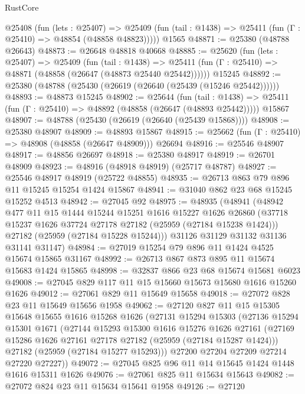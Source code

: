 \begin{lexlean}{RustCore}
\begin{coremodule}
    @25408
      (fun (lets : @25407) =>
      @25409 (fun (tail : @1438) => @25411 (fun (Γ : @25410) => @48854 (@48858 @48823)))))
    @1565
@48871 := @25380 (@48788 @26643)
@48873 := @26648 @48818 @40668
@48885 := @25620
    (fun (lets : @25407) =>
    @25409
      (fun (tail : @1438) =>
      @25411 (fun (Γ : @25410) => @48871 (@48858 (@26647 (@48873 @25440 @25442))))))
    @15245
@48892 := @25380 (@48788 (@25430 (@26619 (@26640 (@25439 (@15246 @25442))))))
@48893 := @48873 @15245
@48902 := @25644
    (fun (tail : @1438) => @25411 (fun (Γ : @25410) => @48892 (@48858 (@26647 (@48893 @25442)))))
    @15867
@48907 := @48788 (@25430 (@26619 (@26640 (@25439 @15868))))
@48908 := @25380 @48907
@48909 := @48893 @15867
@48915 := @25662 (fun (Γ : @25410) => @48908 (@48858 (@26647 @48909))) @26694
@48916 := @25546 @48907
@48917 := @48856 @26697
@48918 := @25380 @48917
@48919 := @26701 @48909
@48923 := @48916 (@48918 @48919) (@25717 @48787)
@48927 := @25546 @48917 @48919 (@25722 @48855)
@48935 := @26713 @863 @79 @896 @11 @15245 @15254 @1424 @15867
@48941 := @31040 @862 @23 @68 @15245 @15252 @4513
@48942 := @27045 @92
@48975 := @48935
    (@48941
      (@48942
        @477
        @11
        @15
        @1444
        @15244
        @15251
        @1616
        @15227
        @1626
        @26860
        (@37718 @15237 @1626 @37724 @27178 @27182 (@25959 (@27184 @15238 @1424)))
        @27182
        (@25959 (@27184 @15228 @15244)))
      @31126
      @31129
      @31132
      @31136
      @31141
      @31147)
@48984 := @27019 @15254 @79 @896 @11 @1424 @4525 @15674 @15865 @31167
@48992 := @26713 @867 @873 @895 @11 @15674 @15683 @1424 @15865
@48998 := @32837 @866 @23 @68 @15674 @15681 @6023
@49008 := @27045 @829 @117 @11 @15 @15660 @15673 @15680 @1616 @15260 @1626
@49012 := @27061 @829 @11 @15649 @15658
@49018 := @27072 @828 @23 @11 @15649 @15656 @1958
@49062 := @27120
    @827
    @11
    @15
    @15305
    @15648
    @15655
    @1616
    @15268
    @1626
    (@27131
      @15294
      @15303
      (@27136
        @15294
        @15301
        @1671
        (@27144
          @15293
          @15300
          @1616
          @15276
          @1626
          @27161
          (@27169 @15286 @1626 @27161 @27178 @27182 (@25959 (@27184 @15287 @1424)))
          @27182
          (@25959 (@27184 @15277 @15293)))
        @27200
        @27204
        @27209
        @27214
        @27220
        @27227))
@49072 := @27045 @825 @96 @11 @14 @15645 @1424 @1448 @1616 @15311 @1626
@49076 := @27061 @825 @11 @15634 @15643
@49082 := @27072 @824 @23 @11 @15634 @15641 @1958
@49126 := @27120

\end{coremodule}
\end{lexlean}
